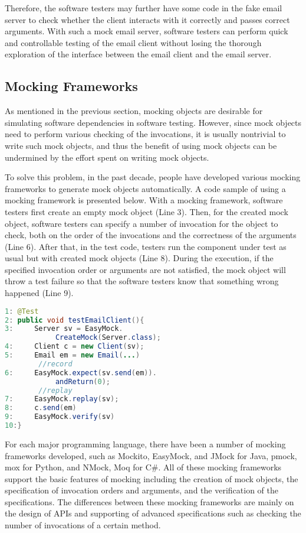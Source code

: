Therefore, the software testers may further have some code in the fake email server to check whether the client interacts with it correctly and passes correct arguments. With such a mock email server, software testers can perform quick and controllable testing of the email client without losing the thorough exploration of the interface between the email client and the email server.


\subsection{Mocking Frameworks}

As mentioned in the previous section, mocking objects are desirable for simulating software dependencies in software testing. However, since mock objects need to perform various checking of the invocations, it is usually nontrivial to write such mock objects, and thus the benefit of using mock objects can be undermined by the effort spent on writing mock objects. 

To solve this problem, in the past decade, people have developed various mocking frameworks to generate mock objects automatically. A code sample of using a mocking framework is presented below. With a mocking framework, software testers first create an empty mock object (Line 3). Then, for the created mock object, software testers can specify a number of invocation for the object to check, both on the order of the invocations and the correctness of the arguments (Line 6). After that, in the test code, testers run the component under test as usual but with created mock objects (Line 8). During the execution, if the specified invocation order or arguments are not satisfied, the mock object will throw a test failure so that the software testers know that something wrong happened (Line 9). 

\vspace{-0.3cm}
\begin{lstlisting}[language=Java]
1: @Test
2: public void testEmailClient(){
3:     Server sv = EasyMock.
            CreateMock(Server.class); 
4:     Client c = new Client(sv);         
5:     Email em = new Email(...)
        //record
6:     EasyMock.expect(sv.send(em)).
            andReturn(0);
        //replay
7:     EasyMock.replay(sv);
8:     c.send(em)
9:     EasyMock.verify(sv)
10:}
\end{lstlisting}
\vspace{-0.3cm}

For each major programming language, there have been a number of mocking frameworks developed, such as Mockito, EasyMock, and JMock for Java, pmock, mox for Python, and NMock, Moq for C\#. All of these mocking frameworks support the basic features of mocking including the creation of mock objects, the specification of invocation orders and arguments, and the verification of the specifications. The differences between these mocking frameworks are mainly on the design of APIs and supporting of advanced specifications such as checking the number of invocations of a certain method. 
